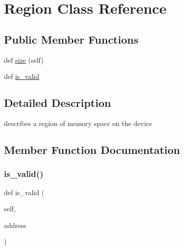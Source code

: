 \hypertarget{classstm__tools_1_1serialflasher_1_1devices_1_1Region}{}\section{Region Class Reference}
\label{classstm__tools_1_1serialflasher_1_1devices_1_1Region}
\subsection*{Public Member Functions}
\begin{DoxyCompactItemize}
\item 
def \hyperlink{classstm__tools_1_1serialflasher_1_1devices_1_1Region_a6d620a10dad91cadcb542e6098ada619}{size} (self)
\item 
def \hyperlink{classstm__tools_1_1serialflasher_1_1devices_1_1Region_ab8ec952ac9912f234bcf2575cb7a28e9}{is\+\_\+valid}
\end{DoxyCompactItemize}


\subsection{Detailed Description}
\begin{DoxyVerb}describes a region of memory space on the device\end{DoxyVerb}
 

\subsection{Member Function Documentation}
\mbox{\label{classstm__tools_1_1serialflasher_1_1devices_1_1Region_ab8ec952ac9912f234bcf2575cb7a28e9}} 
\subsubsection{\texorpdfstring{is\+\_\+valid()}{is\_valid()}}
{\footnotesize\ttfamily def is\+\_\+valid (\begin{DoxyParamCaption}\item[{}]{self,  }\item[{}]{address }\end{DoxyParamCaption})}

